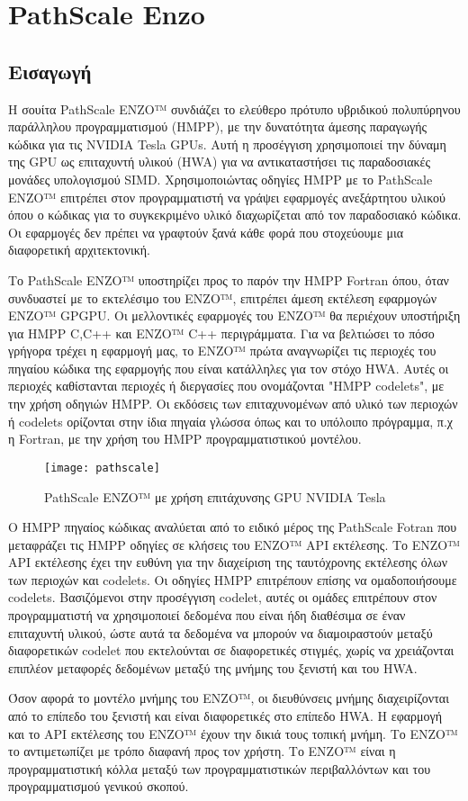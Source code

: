 \section{PathScale Enzo}
\subsection{Εισαγωγή}
Η σουίτα PathScale ENZO™ συνδιάζει το ελεύθερο πρότυπο υβριδικού πολυπύρηνου παράλληλου προγραμματισμού (HMPP), με την δυνατότητα άμεσης παραγωγής κώδικα για τις NVIDIA Tesla GPUs. Αυτή η προσέγγιση χρησιμοποιεί την δύναμη της GPU ως επιταχυντή υλικού (HWA) για να αντικαταστήσει τις παραδοσιακές μονάδες υπολογισμού SIMD. Χρησιμοποιώντας οδηγίες HMPP με το PathScale ENZO™ επιτρέπει στον προγραμματιστή να γράψει εφαρμογές ανεξάρτητου υλικού όπου ο κώδικας για το συγκεκριμένο υλικό διαχωρίζεται από τον παραδοσιακό κώδικα. Οι εφαρμογές δεν πρέπει να γραφτούν ξανά κάθε φορά που στοχεύουμε μια διαφορετική αρχιτεκτονική. 

Το PathScale ENZO™ υποστηρίζει προς το παρόν την HMPP Fortran όπου, όταν συνδυαστεί με το εκτελέσιμο του ENZO™, επιτρέπει άμεση εκτέλεση εφαρμογών ENZO™ GPGPU. Οι μελλοντικές εφαρμογές του ENZO™ θα περιέχουν υποστήριξη για HMPP C,C++ και ENZO™ C++ περιγράμματα. Για να βελτιώσει το πόσο γρήγορα τρέχει η εφαρμογή μας, το ENZO™ πρώτα αναγνωρίζει τις περιοχές του πηγαίου κώδικα της εφαρμογής που είναι κατάλληλες για τον στόχο HWA. Αυτές οι περιοχές καθίστανται περιοχές ή διεργασίες που ονομάζονται "HMPP codelets", με την χρήση οδηγιών HMPP. Οι εκδόσεις των επιταχυνομένων από υλικό των περιοχών ή codelets ορίζονται στην ίδια πηγαία γλώσσα όπως και το υπόλοιπο πρόγραμμα, π.χ η Fortran, με την χρήση του HMPP προγραμματιστικού μοντέλου.\cite{pathscale-1}

\begin{figure}[h]
	\texttt{[image: pathscale]}
	\centering
	\caption{PathScale ENZO™ με χρήση επιτάχυνσης GPU NVIDIA Tesla}
\end{figure}


Ο HMPP πηγαίος κώδικας αναλύεται από το ειδικό μέρος της PathScale Fotran που μεταφράζει τις HMPP οδηγίες σε κλήσεις του ENZO™ API εκτέλεσης. Το ENZO™ API εκτέλεσης έχει την ευθύνη για την διαχείριση της ταυτόχρονης εκτέλεσης όλων των περιοχών και codelets. Οι οδηγίες HMPP επιτρέπουν επίσης να ομαδοποιήσουμε codelets. Βασιζόμενοι στην προσέγγιση codelet, αυτές οι ομάδες επιτρέπουν στον προγραμματιστή να χρησιμοποιεί δεδομένα που είναι ήδη διαθέσιμα σε έναν επιταχυντή υλικού, ώστε αυτά τα δεδομένα να μπορούν να διαμοιραστούν μεταξύ διαφορετικών codelet που εκτελούνται σε διαφορετικές στιγμές, χωρίς να χρειάζονται επιπλέον μεταφορές δεδομένων μεταξύ της μνήμης του ξενιστή και του HWA.

Όσον αφορά το μοντέλο μνήμης του ENZO™, οι διευθύνσεις μνήμης διαχειρίζονται από το επίπεδο του ξενιστή και είναι διαφορετικές στο επίπεδο HWA. Η εφαρμογή και το API εκτέλεσης του ENZO™ έχουν την δικιά τους τοπική μνήμη. Το ENZO™ το αντιμετωπίζει με τρόπο διαφανή προς τον χρήστη. Το ENZO™ είναι η προγραμματιστική κόλλα μεταξύ των προγραμματιστικών περιβαλλόντων και του προγραμματισμού γενικού σκοπού.

